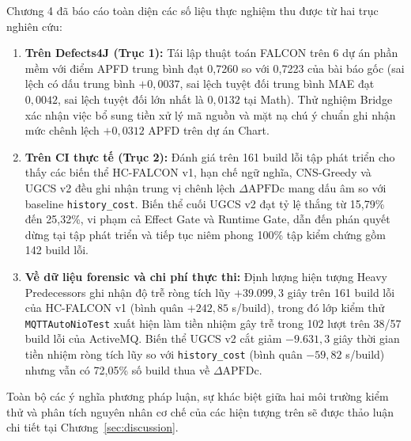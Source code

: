 Chương 4 đã báo cáo toàn diện các số liệu thực nghiệm thu được từ hai trục nghiên cứu:
\begin{enumerate}
    \item \textbf{Trên Defects4J (Trục 1):} Tái lập thuật toán FALCON trên 6 dự án phần mềm với điểm APFD trung bình đạt 0,7260 so với 0,7223 của bài báo gốc (sai lệch có dấu trung bình $+0,0037$, sai lệch tuyệt đối trung bình MAE đạt $0,0042$, sai lệch tuyệt đối lớn nhất là $0,0132$ tại Math). Thử nghiệm Bridge xác nhận việc bổ sung tiền xử lý mã nguồn và mặt nạ chú ý chuẩn ghi nhận mức chênh lệch $+0,0312$ APFD trên dự án Chart.
    \item \textbf{Trên CI thực tế (Trục 2):} Đánh giá trên 161 build lỗi tập phát triển cho thấy các biến thể HC-FALCON v1, hạn chế ngữ nghĩa, CNS-Greedy và UGCS v2 đều ghi nhận trung vị chênh lệch $\Delta\text{APFDc}$ mang dấu âm so với baseline \texttt{history\_cost}. Biến thể cuối UGCS v2 đạt tỷ lệ thắng từ 15,79\% đến 25,32\%, vi phạm cả Effect Gate và Runtime Gate, dẫn đến phán quyết dừng tại tập phát triển và tiếp tục niêm phong 100\% tập kiểm chứng gồm 142 build lỗi.
    \item \textbf{Về dữ liệu forensic và chi phí thực thi:} Định lượng hiện tượng Heavy Predecessors ghi nhận độ trễ ròng tích lũy $+39.099,3$ giây trên 161 build lỗi của HC-FALCON v1 (bình quân $+242,85$ s/build), trong đó lớp kiểm thử \texttt{MQTTAutoNioTest} xuất hiện làm tiền nhiệm gây trễ trong 102 lượt trên 38/57 build lỗi của ActiveMQ. Biến thể UGCS v2 cắt giảm $-9.631,3$ giây thời gian tiền nhiệm ròng tích lũy so với \texttt{history\_cost} (bình quân $-59,82$ s/build) nhưng vẫn có 72,05\% số build thua về $\Delta\text{APFDc}$.
\end{enumerate}

Toàn bộ các ý nghĩa phương pháp luận, sự khác biệt giữa hai môi trường kiểm thử và phân tích nguyên nhân cơ chế của các hiện tượng trên sẽ được thảo luận chi tiết tại Chương~\ref{sec:discussion}.
